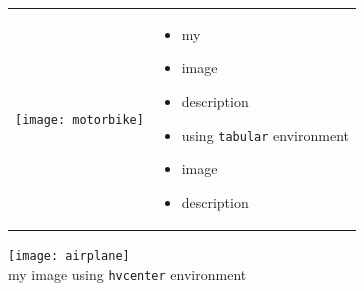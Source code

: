 \documentclass[11pt, a4paper, landscape]{article}
\begin{document}
\NewPage{}
\vfill
\begin{table}
  \centering
  \begin{tabular}{@{} M{.3\linewidth} M{.7\linewidth} @{}}
    \texttt{[image: motorbike]}
    & 
    \begin{itemize}
    \item my
    \item image
    \item description
    \item using \texttt{tabular} environment
    \item image
    \item description
    \end{itemize}
  \end{tabular}
\end{table}
\vfill

\NewPage{}
\begin{hvcenter}
  \texttt{[image: airplane]}\\
  my image using \texttt{hvcenter} environment
\end{hvcenter}
\end{document}

